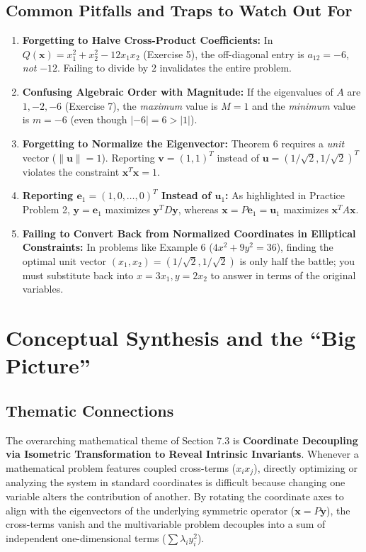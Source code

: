 \documentclass[11pt, letterpaper]{article}
\theoremstyle{definition}
\theoremstyle{remark}
\begin{document}
\subsection{Common Pitfalls and Traps to Watch Out For}
\begin{enumerate}[label=\textbf{Trap \arabic*:}]
    \item \textbf{Forgetting to Halve Cross-Product Coefficients:} In $Q(\mathbf{x}) = x_1^2 + x_2^2 - 12x_1x_2$ (Exercise 5), the off-diagonal entry is $a_{12} = -6$, \emph{not} $-12$. Failing to divide by $2$ invalidates the entire problem.
    \item \textbf{Confusing Algebraic Order with Magnitude:} If the eigenvalues of $A$ are $1, -2, -6$ (Exercise 7), the \emph{maximum} value is $M = 1$ and the \emph{minimum} value is $m = -6$ (even though $|-6| = 6 > |1|$).
    \item \textbf{Forgetting to Normalize the Eigenvector:} Theorem 6 requires a \emph{unit} vector ($\|\mathbf{u}\| = 1$). Reporting $\mathbf{v} = (1, 1)^T$ instead of $\mathbf{u} = (1/\sqrt{2}, 1/\sqrt{2})^T$ violates the constraint $\mathbf{x}^T\mathbf{x} = 1$.
    \item \textbf{Reporting $\mathbf{e}_1 = (1, 0, \dots, 0)^T$ Instead of $\mathbf{u}_1$:} As highlighted in Practice Problem 2, $\mathbf{y} = \mathbf{e}_1$ maximizes $\mathbf{y}^T D \mathbf{y}$, whereas $\mathbf{x} = P\mathbf{e}_1 = \mathbf{u}_1$ maximizes $\mathbf{x}^T A \mathbf{x}$.
    \item \textbf{Failing to Convert Back from Normalized Coordinates in Elliptical Constraints:} In problems like Example 6 ($4x^2 + 9y^2 = 36$), finding the optimal unit vector $(x_1, x_2) = (1/\sqrt{2}, 1/\sqrt{2})$ is only half the battle; you must substitute back into $x = 3x_1, y = 2x_2$ to answer in terms of the original variables.
\end{enumerate}

\newpage
\section{Conceptual Synthesis and the ``Big Picture''}

\subsection{Thematic Connections}
The overarching mathematical theme of Section 7.3 is \textbf{Coordinate Decoupling via Isometric Transformation to Reveal Intrinsic Invariants}. Whenever a mathematical problem features coupled cross-terms ($x_i x_j$), directly optimizing or analyzing the system in standard coordinates is difficult because changing one variable alters the contribution of another. By rotating the coordinate axes to align with the eigenvectors of the underlying symmetric operator ($\mathbf{x} = P\mathbf{y}$), the cross-terms vanish and the multivariable problem decouples into a sum of independent one-dimensional terms ($\sum \lambda_i y_i^2$).
\end{document}
